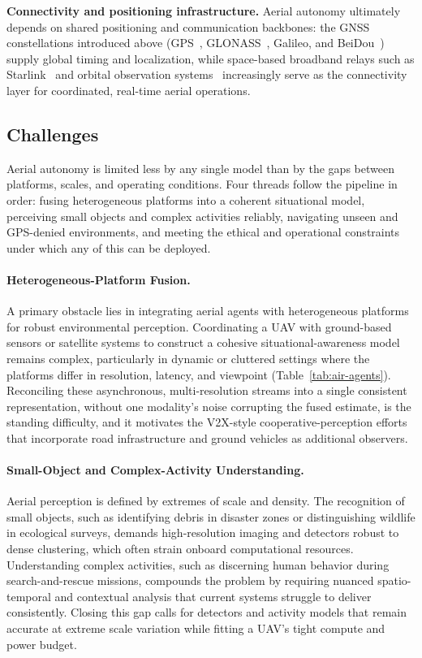 \textbf{Connectivity and positioning infrastructure.} Aerial autonomy ultimately depends on shared positioning and communication backbones: the GNSS constellations introduced above (GPS~\cite{enge1994global}, GLONASS~\cite{ivanov1992glonass}, Galileo, and BeiDou~\cite{yang2019introduction}) supply global timing and localization, while space-based broadband relays such as Starlink~\cite{michel2022first} and orbital observation systems~\cite{cunningham2004national} increasingly serve as the connectivity layer for coordinated, real-time aerial operations.


\subsection{Challenges}
\label{subsec:p4-sec9-4-challenges}
Aerial autonomy is limited less by any single model than by the gaps between platforms, scales, and operating conditions. Four threads follow the pipeline in order: fusing heterogeneous platforms into a coherent situational model, perceiving small objects and complex activities reliably, navigating unseen and GPS-denied environments, and meeting the ethical and operational constraints under which any of this can be deployed.

\paragraph{Heterogeneous-Platform Fusion.}
A primary obstacle lies in integrating aerial agents with heterogeneous platforms for robust environmental perception. Coordinating a UAV with ground-based sensors or satellite systems to construct a cohesive situational-awareness model remains complex, particularly in dynamic or cluttered settings where the platforms differ in resolution, latency, and viewpoint (Table~\ref{tab:air-agents}). Reconciling these asynchronous, multi-resolution streams into a single consistent representation, without one modality's noise corrupting the fused estimate, is the standing difficulty, and it motivates the V2X-style cooperative-perception efforts that incorporate road infrastructure and ground vehicles as additional observers.

\paragraph{Small-Object and Complex-Activity Understanding.}
Aerial perception is defined by extremes of scale and density. The recognition of small objects, such as identifying debris in disaster zones or distinguishing wildlife in ecological surveys, demands high-resolution imaging and detectors robust to dense clustering, which often strain onboard computational resources. Understanding complex activities, such as discerning human behavior during search-and-rescue missions, compounds the problem by requiring nuanced spatio-temporal and contextual analysis that current systems struggle to deliver consistently. Closing this gap calls for detectors and activity models that remain accurate at extreme scale variation while fitting a UAV's tight compute and power budget.

